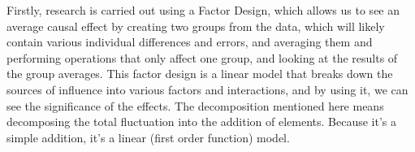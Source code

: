 \documentclass{ltjbook}
\begin{document}
Firstly, research is carried out using a Factor Design, which allows us to see an average causal effect by creating two groups from the data, which will likely contain various individual differences and errors, and averaging them and performing operations that only affect one group, and looking at the results of the group averages. This factor design is a linear model that breaks down the sources of influence into various factors and interactions, and by using it, we can see the significance of the effects. The decomposition mentioned here means decomposing the total fluctuation into the addition of elements. Because it’s a simple addition, it’s a linear (first order function) model.
\end{document}
